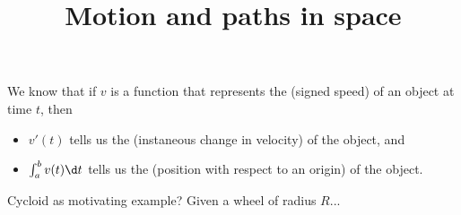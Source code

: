 \documentclass{ximera}
\title[Dig-In:]{Motion and paths in space}
\begin{document}
\begin{abstract}
\end{abstract}
\maketitle

We know that if $v$ is a function that represents the 
(signed speed) of an object at time $t$, then
\begin{itemize}
\item $v'(t)$ tells us the  (instaneous change in
  velocity) of the object, and
\item $\int_a^b v(t) \d t$ tells us the  (position
  with respect to an origin) of the object.
\end{itemize}




Cycloid as motivating example? Given a wheel of radius $R$... 
\end{document}
